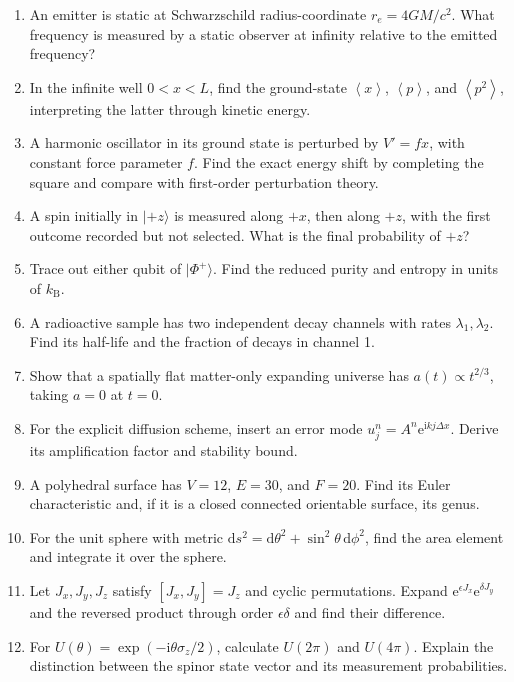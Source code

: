\documentclass[11pt,oneside]{book}
\newcommand{\dd}{\mathrm{d}}
\newcommand{\ii}{\mathrm{i}}
\newcommand{\ee}{\mathrm{e}}
\newcommand{\avg}[1]{\left\langle #1\right\rangle}
\newcommand{\ket}[1]{\lvert #1\rangle}
\newcommand{\kb}{k_{\mathrm B}}
\theoremstyle{reviewstyle}
\begin{document}
\begin{enumerate}
\item An emitter is static at Schwarzschild radius-coordinate $r_e=4GM/c^2$. What frequency is measured by a static observer at infinity relative to the emitted frequency?
\item In the infinite well $0<x<L$, find the ground-state $\avg x$, $\avg p$, and $\avg{p^2}$, interpreting the latter through kinetic energy.
\item A harmonic oscillator in its ground state is perturbed by $V'=fx$, with constant force parameter $f$. Find the exact energy shift by completing the square and compare with first-order perturbation theory.
\item A spin initially in $\ket{+z}$ is measured along $+x$, then along $+z$, with the first outcome recorded but not selected. What is the final probability of $+z$?
\item Trace out either qubit of $\ket{\Phi^+}$. Find the reduced purity and entropy in units of $\kb$.
\item A radioactive sample has two independent decay channels with rates $\lambda_1,\lambda_2$. Find its half-life and the fraction of decays in channel 1.
\item Show that a spatially flat matter-only expanding universe has $a(t)\propto t^{2/3}$, taking $a=0$ at $t=0$.
\item For the explicit diffusion scheme, insert an error mode $u_j^n=A^n\ee^{\ii kj\Delta x}$. Derive its amplification factor and stability bound.
\item A polyhedral surface has $V=12$, $E=30$, and $F=20$. Find its Euler characteristic and, if it is a closed connected orientable surface, its genus.
\item For the unit sphere with metric $\dd s^2=\dd\theta^2+\sin^2\theta\,\dd\phi^2$, find the area element and integrate it over the sphere.
\item Let $J_x,J_y,J_z$ satisfy $[J_x,J_y]=J_z$ and cyclic permutations. Expand $\ee^{\epsilon J_x}\ee^{\delta J_y}$ and the reversed product through order $\epsilon\delta$ and find their difference.
\item For $U(\theta)=\exp(-\ii\theta\sigma_z/2)$, calculate $U(2\pi)$ and $U(4\pi)$. Explain the distinction between the spinor state vector and its measurement probabilities.
\end{enumerate}
\end{document}
